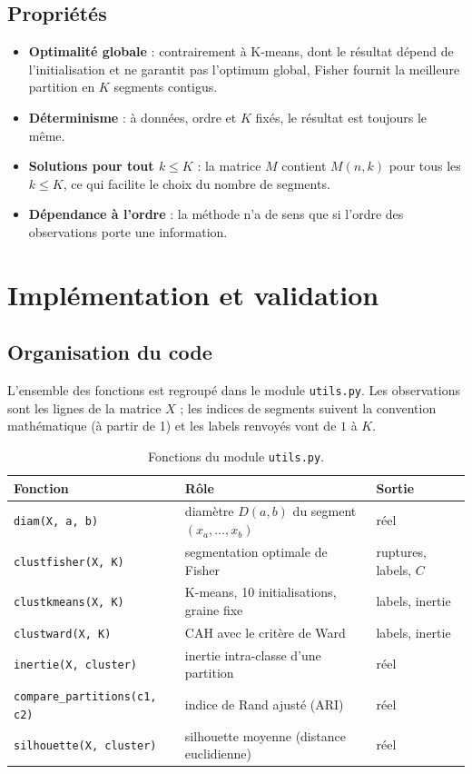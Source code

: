 \documentclass[10pt,a4paper]{article}
\begin{document}
\subsection{Propriétés}

\begin{itemize}
  \item \textbf{Optimalité globale} : contrairement à K-means, dont le résultat
        dépend de l'initialisation et ne garantit pas l'optimum global, Fisher fournit la meilleure
        partition en $K$ segments contigus.
  \item \textbf{Déterminisme} : à données, ordre et $K$ fixés, le résultat est
        toujours le même.
  \item \textbf{Solutions pour tout $k\le K$} : la matrice $M$ contient $M(n,k)$
        pour tous les $k\le K$, ce qui facilite le choix du nombre de segments.
  \item \textbf{Dépendance à l'ordre} : la méthode n'a de sens que si l'ordre des
        observations porte une information.
\end{itemize}

\clearpage
\begingroup
\fontsize{11}{14}\selectfont
\section{Implémentation et validation}

\subsection{Organisation du code}

L'ensemble des fonctions est regroupé dans le module \texttt{utils.py}. Les
observations sont les lignes de la matrice $X$ ; les indices de segments suivent
la convention mathématique (à partir de 1) et les labels renvoyés vont de $1$ à $K$.

\begin{table}[H]
\centering
\small
\begin{tabular}{@{}lll@{}}
\toprule
\textbf{Fonction} & \textbf{Rôle} & \textbf{Sortie} \\
\midrule
\texttt{diam(X, a, b)} & diamètre $D(a,b)$ du segment $(x_a,\dots,x_b)$ & réel \\
\texttt{clustfisher(X, K)} & segmentation optimale de Fisher & ruptures, labels, $C$ \\
\texttt{clustkmeans(X, K)} & K-means, 10 initialisations, graine fixe & labels, inertie \\
\texttt{clustward(X, K)} & CAH avec le critère de Ward & labels, inertie \\
\texttt{inertie(X, cluster)} & inertie intra-classe d'une partition & réel \\
\texttt{compare\_partitions(c1, c2)} & indice de Rand ajusté (ARI) & réel \\
\texttt{silhouette(X, cluster)} & silhouette moyenne (distance euclidienne) & réel \\
\bottomrule
\end{tabular}
\caption{Fonctions du module \texttt{utils.py}.}
\end{table}
\end{document}
